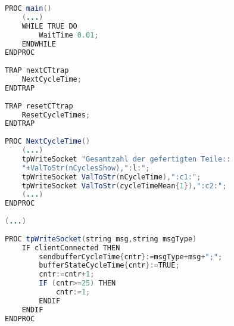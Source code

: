 \label{app:CycleTimer}
\begin{lstlisting}[language=Java, caption=Task CycleTimer - Modul 
CycleTimer]
PROC main()
	(...)
	WHILE TRUE DO		
		WaitTime 0.01;
	ENDWHILE
ENDPROC
	
TRAP nextCTtrap
	NextCycleTime;	
ENDTRAP
	
TRAP resetCTtrap
	ResetCycleTimes;	
ENDTRAP
	
PROC NextCycleTime()		
	(...)
    tpWriteSocket "Gesamtzahl der gefertigten Teile:: 
    "+ValToStr(nCyclesShow),":l:";
	tpWriteSocket ValToStr(nCycleTime),":c1:";
	tpWriteSocket ValToStr(cycleTimeMean{1}),":c2:";
	(...)
ENDPROC
	
(...)
	
PROC tpWriteSocket(string msg,string msgType)
	IF clientConnected THEN
		sendbufferCycleTime{cntr}:=msgType+msg+";";
		bufferStateCycleTime{cntr}:=TRUE;	
		cntr:=cntr+1;
		IF (cntr>=25) THEN
			cntr:=1;
        ENDIF
	ENDIF
ENDPROC
\end{lstlisting}